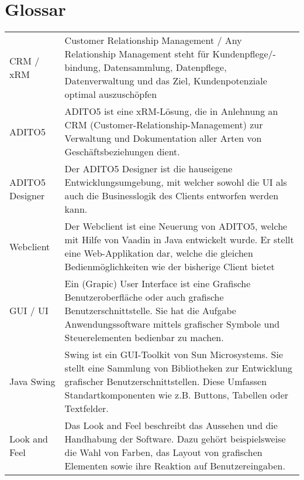 \section{Glossar}
\begin{center}
	\begin{tabularx}{\textwidth}{p{}|X}
	    CRM / xRM & 
		Customer Relationship Management / Any Relationship Management
	  	steht für Kundenpflege/-bindung, Datensammlung, Datenpflege, Datenverwaltung und das Ziel, Kundenpotenziale optimal auszuschöpfen \\ 
	  	ADITO5 &
	  	ADITO5 ist eine xRM-Lösung, die in Anlehnung an CRM (Customer-Relationship-Management)
	  	zur Verwaltung und Dokumentation aller Arten von Geschäftsbeziehungen dient. \\
	  	ADITO5 Designer &
	  	Der ADITO5 Designer ist die hauseigene Entwicklungsumgebung, mit welcher sowohl die UI als
	  	auch die Businesslogik des Clients entworfen werden kann. \\
	  	Webclient &
	  	Der Webclient ist eine Neuerung von ADITO5, welche mit Hilfe von Vaadin in Java entwickelt wurde. Er stellt eine Web-Applikation dar, welche die gleichen Bedienmöglichkeiten wie der bisherige Client bietet \\
	  	GUI / UI &
	  	Ein (Grapic) User Interface ist eine Grafische Benutzeroberfläche oder auch grafische Benutzerschnittstelle. Sie hat die Aufgabe Anwendungssoftware mittels grafischer Symbole und Steuerelementen bedienbar zu machen. \\
	  	Java Swing &
	  	Swing ist ein GUI-Toolkit von Sun Microsystems. Sie stellt eine Sammlung von Bibliotheken zur Entwicklung grafischer Benutzerschnittstellen. Diese Umfassen Standartkomponenten wie z.B. Buttons, Tabellen oder Textfelder. \\
	  	
	  	Look and Feel &
	  	Das Look and Feel beschreibt das Aussehen und die Handhabung der Software. Dazu gehört beispielsweise die Wahl von Farben, das Layout von grafischen Elementen sowie ihre Reaktion auf Benutzereingaben.
	  	 \\
	\end{tabularx}
\end{center}
